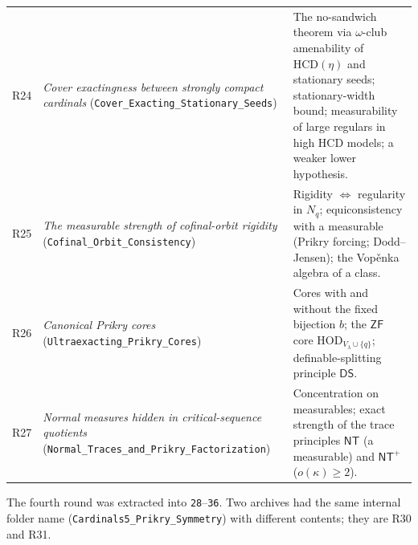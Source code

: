 \documentclass[11pt,letterpaper]{article}
\theoremstyle{definition}
\numberwithin{equation}{section}
\newcommand{\ZF}{\mathsf{ZF}}
\newcommand{\HOD}{\mathrm{HOD}}
\newcommand{\HCD}{\mathrm{HCD}}
\newcommand{\R}[1]{\textsf{R#1}}
\begin{document}
\begin{center}
\begin{tabularx}{\textwidth}{@{}lP{.33\textwidth}Y@{}}
\R{24}&\emph{Cover exactingness between strongly compact cardinals} (\nolinkurl{Cover_Exacting_Stationary_Seeds})&The no-sandwich theorem via $\omega$-club amenability of $\HCD(\eta)$ and stationary seeds; stationary-width bound; measurability of large regulars in high $\HCD$ models; a weaker lower hypothesis.\\
\R{25}&\emph{The measurable strength of cofinal-orbit rigidity} (\nolinkurl{Cofinal_Orbit_Consistency})&Rigidity $\Leftrightarrow$ regularity in $N_q$; equiconsistency with a measurable (Prikry forcing; Dodd--Jensen); the Vop\v enka algebra of a class.\\
\R{26}&\emph{Canonical Prikry cores} (\nolinkurl{Ultraexacting_Prikry_Cores})&Cores with and without the fixed bijection $b$; the $\ZF$ core $\HOD_{V_\lambda\cup\{q\}}$; definable-splitting principle $\mathsf{DS}$.\\
\R{27}&\emph{Normal measures hidden in critical-sequence quotients} (\nolinkurl{Normal_Traces_and_Prikry_Factorization})&Concentration on measurables; exact strength of the trace principles $\mathsf{NT}$ (a measurable) and $\mathsf{NT}^+$ ($o(\kappa)\ge2$).\\
\bottomrule
\end{tabularx}
\end{center}

The fourth round was extracted into \nolinkurl{28}--\nolinkurl{36}. Two archives had the same internal folder name (\nolinkurl{Cardinals5_Prikry_Symmetry}) with different contents; they are \R{30} and \R{31}.
\end{document}
